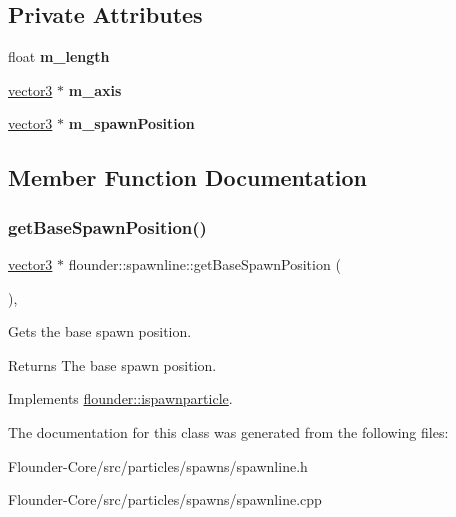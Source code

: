 \subsection*{Private Attributes}
\begin{DoxyCompactItemize}
\item 
\mbox{\label{classflounder_1_1spawnline_aa8b5f3c44d940a0c4cfc122f1a50ee48}} 
float {\bfseries m\+\_\+length}
\item 
\mbox{\label{classflounder_1_1spawnline_a2bf151af0fce71c43c663ab9ed89b259}} 
\hyperlink{classflounder_1_1vector3}{vector3} $\ast$ {\bfseries m\+\_\+axis}
\item 
\mbox{\label{classflounder_1_1spawnline_aa6833d2731af8bef2602bab15412575e}} 
\hyperlink{classflounder_1_1vector3}{vector3} $\ast$ {\bfseries m\+\_\+spawn\+Position}
\end{DoxyCompactItemize}


\subsection{Member Function Documentation}
\mbox{\label{classflounder_1_1spawnline_a264fd2342ff51355bfd5e3fa2235bc9b}} 
\subsubsection{\texorpdfstring{get\+Base\+Spawn\+Position()}{getBaseSpawnPosition()}}
{\footnotesize\ttfamily \hyperlink{classflounder_1_1vector3}{vector3} $\ast$ flounder\+::spawnline\+::get\+Base\+Spawn\+Position (\begin{DoxyParamCaption}{ }\end{DoxyParamCaption})\hspace{0.3cm}{\ttfamily [override]}, {\ttfamily [virtual]}}



Gets the base spawn position. 

\begin{DoxyReturn}{Returns}
The base spawn position. 
\end{DoxyReturn}


Implements \hyperlink{classflounder_1_1ispawnparticle_a3e59019906bbb5ba8df82a4f6e847ef6}{flounder\+::ispawnparticle}.



The documentation for this class was generated from the following files\+:\begin{DoxyCompactItemize}
\item 
Flounder-\/\+Core/src/particles/spawns/spawnline.\+h\item 
Flounder-\/\+Core/src/particles/spawns/spawnline.\+cpp\end{DoxyCompactItemize}
